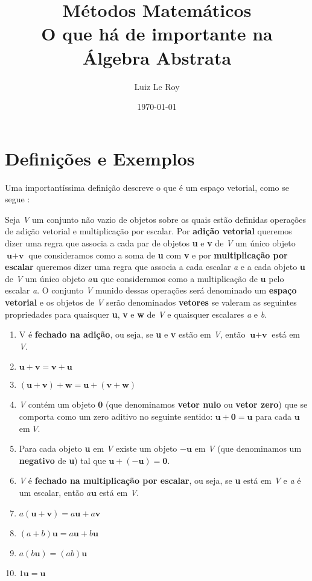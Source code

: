 \documentclass[a4paper]{article}
\title{Métodos Matemáticos\\O que há de importante na Álgebra Abstrata}
\author{Luiz Le Roy}
\date{\today}
\newenvironment{definition}[1][Definição]{\begin{trivlist}
\item[\hskip \labelsep {\bfseries #1}]}{\end{trivlist}}
\begin{document}
\maketitle


\section{Definições e Exemplos}
Uma importantíssima definição descreve o que é um espaço vetorial, como se segue \cite{anton}:
\begin{definition}
Seja \textit{V} um conjunto não vazio de objetos sobre os quais estão definidas operações de adição vetorial e multiplicação por escalar. Por \textbf{adição vetorial} queremos dizer uma regra que associa a cada par de objetos \textbf{u} e \textbf{v} de \textit{V} um único objeto $\textbf{u}+\textbf{v}$ que consideramos como a soma de \textbf{u} com \textbf{v} e por \textbf{multiplicação por escalar} queremos dizer uma regra que associa a cada escalar \textit{a} e a cada objeto \textbf{u} de \textit{V} um único objeto $\textit{a}\textbf{u}$ que consideramos como a multiplicação de \textbf{u} pelo escalar \textit{a}. O conjunto \textit{V} munido dessas operações será denominado um \textbf{espaço vetorial} e os objetos de \textit{V} serão denominados \textbf{vetores} se valeram as seguintes propriedades para quaisquer \textbf{u}, \textbf{v} e \textbf{w} de \textit{V} e quaisquer escalares \textit{a} e \textit{b}.
\begin{enumerate}
\item V é \textbf{fechado na adição}, ou seja, se \textbf{u} e \textbf{v} estão em \textit{V}, então $\textbf{u}+\textbf{v}$ está em \textit{V}.
\item $ \mathbf{u}+\mathbf{v}=\mathbf{v}+\mathbf{u}$
\item $ (\mathbf{u}+\mathbf{v})+\mathbf{w}=\mathbf{u}+(\mathbf{v}+\mathbf{w})$
\item \textit{V} contém um objeto \textbf{0} (que denominamos \textbf{vetor nulo} ou \textbf{vetor zero}) que se comporta como um zero aditivo no seguinte sentido: $\mathbf{u}+\mathbf{0}=\mathbf{u}$ para cada $\mathbf{u}$ em $\mathit{V}$.
\item Para cada objeto \textbf{u} em \textit{V} existe um objeto $-\mathbf{u}$ em \textit{V} (que denominamos um \textbf{negativo} de \textbf{u}) tal que $\mathbf{u}+\mathbf{(-u)}=\mathbf{0}$.
\item \textit{V} é \textbf{fechado na multiplicação por escalar}, ou seja, se \textbf{u} está em \textit{V} e \textit{a} é um escalar, então $\textit{a}\textbf{u}$ está em \textit{V}.
\item $\mathit{a}(\mathbf{u+v})=\mathit{a}\mathbf{u}+\mathit{a}\mathbf{v}$
\item $(\mathit{a+b})\mathbf{u}=\mathit{a}\mathbf{u}+\mathit{b}\mathbf{u}$
\item $\mathit{a}(\mathit{b}\mathbf{u})=(\mathit{a}\mathit{b})\mathbf{u}$
\item $1\mathbf{u}=\mathbf{u}$
\end{enumerate}
\end{definition}
\end{document}
